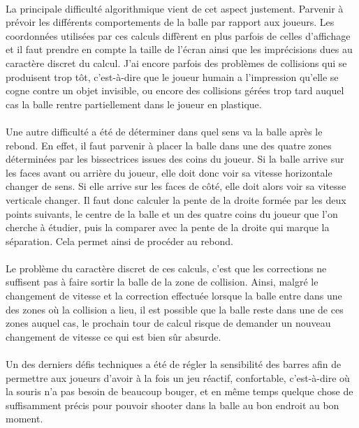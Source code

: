\documentclass[a4paper,12pt]{report}
\begin{document}
\paragraph{}
La principale difficulté algorithmique vient de cet aspect justement. Parvenir à prévoir les différents comportements de la balle par rapport aux
joueurs. Les coordonnées utilisées par ces calculs diffèrent en plus parfois de celles d'affichage et il faut prendre en compte la taille de l'écran ainsi que les imprécisions dues au caractère discret du calcul. J'ai encore parfois des problèmes de collisions qui se produisent trop tôt, c'est-à-dire que le joueur humain a l'impression qu'elle se cogne contre un objet invisible, ou encore des collisions gérées trop tard auquel cas la balle rentre partiellement dans le joueur en plastique.
\paragraph{}
Une autre difficulté a été de déterminer dans quel sens va la balle après le rebond. En effet, il faut parvenir à placer la balle dans une des quatre zones déterminées par les bissectrices issues des coins du joueur. Si la balle arrive sur les faces avant ou arrière du joueur, elle doit donc voir sa vitesse horizontale changer de sens. Si elle arrive sur les faces de côté, elle doit alors voir sa vitesse verticale changer. Il faut donc calculer la pente de la droite formée par les deux points suivants, le centre de la balle et un des quatre coins du joueur que l'on cherche à étudier, puis la comparer avec la pente de la droite qui marque la séparation. Cela permet ainsi de procéder au rebond.
\paragraph{}
Le problème du caractère discret de ces calculs, c'est que les corrections ne suffisent pas à faire sortir la balle de la zone de collision. Ainsi, malgré le changement de vitesse et la correction effectuée lorsque la balle entre dans une des zones où la collision a lieu, il est possible que la balle reste dans une de ces zones auquel cas, le prochain tour de calcul risque de demander un nouveau changement de vitesse ce qui est bien sûr absurde.
\paragraph{}
Un des derniers défis techniques a été de régler la sensibilité des barres afin de permettre aux joueurs d'avoir à la fois un jeu réactif, confortable, c'est-à-dire où la souris n'a pas besoin de beaucoup bouger, et en même temps quelque chose de suffisamment précis pour pouvoir shooter dans la balle au bon endroit au bon moment.
\end{document}
